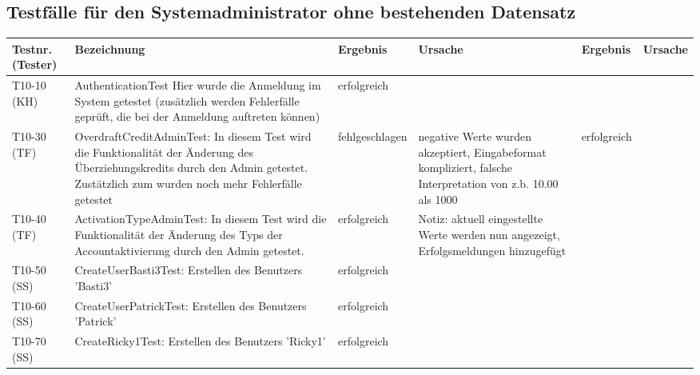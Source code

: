 \begin{landscape}
	\section{Testfälle für den Systemadministrator ohne bestehenden Datensatz}	
		\begin{tabular}{|p{2.0cm} |p{5.0cm}|p{3.0cm}|p{5.0cm}|p{4.0cm}|p{4.0cm}|}
			\hline \textbf{Testnr. (Tester)} & \textbf{Bezeichnung} & \textbf{Ergebnis} & \textbf{Ursache} & \textbf{Ergebnis} & \textbf{Ursache} \\ 
      	    \hline    T10-10 (KH)   &      AuthenticationTest Hier wurde die Anmeldung im System getestet (zusätzlich werden Fehlerfälle geprüft, die bei der Anmeldung auftreten können)   &  erfolgreich &                  &                   &                  \\ 
      	    
      	     \hline    T10-30 (TF)  &    OverdraftCreditAdminTest: In diesem Test wird die Funktionalität der Änderung des Überziehungskredits durch den Admin getestet.
      	                             Zustätzlich zum wurden noch mehr Fehlerfälle getestet   &  fehlgeschlagen &    negative Werte wurden akzeptiert, Eingabeformat kompliziert, falsche Interpretation von z.b. 10.00 als 1000              &      erfolgreich             &                  \\ 
      	                             
      	    \hline    T10-40 (TF)   &    ActivationTypeAdminTest: In diesem Test wird die Funktionalität der Änderung des Typs der Accountaktivierung durch den Admin getestet.
      	      &  erfolgreich &  Notiz: aktuell eingestellte Werte werden nun angezeigt, Erfolgsmeldungen hinzugefügt           &                &                  \\                          
      	                             
      	                             
			\hline T10-50 (SS) & CreateUserBasti3Test: Erstellen des Benutzers 'Basti3' & erfolgreich & & & \\   	                             
      	                             
      	    \hline T10-60 (SS) & CreateUserPatrickTest: Erstellen des Benutzers 'Patrick' & erfolgreich & & & \\
      	    
      	    \hline T10-70 (SS) & CreateRicky1Test: Erstellen des Benutzers 'Ricky1' & erfolgreich & & & \\                       
			

\end{tabular}
\end{landscape}
